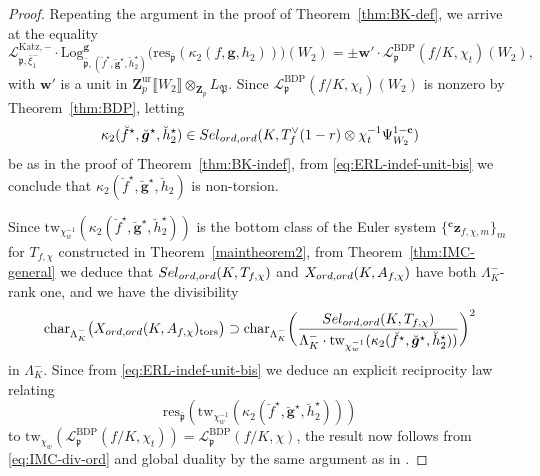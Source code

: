 \documentclass[10pt,letterpaper]{amsart}
\theoremstyle{plain}
\theoremstyle{definition}
\theoremstyle{definition}
\theoremstyle{plain}
\theoremstyle{plain}
\theoremstyle{plain}
\theoremstyle{remark}
\numberwithin{equation}{section}
\newcommand{\cc}{\mathbf{c}}
\newcommand{\Sel}{Sel}
\newcommand{\pp}{\mathfrak{p}}
\newcommand{\ppbar}{\bar{\mathfrak{p}}}
\newcommand{\ord}{{{\rm ord},{\rm ord}}}
\DeclareMathOperator{\ur}{\mathrm{ur}}
\DeclareMathOperator{\BDP}{BDP} %
\newcommand{\Z}{\mathbf{Z}}
\def\Sel{{\rm Sel}}
\newcommand{\dBr}[1]{\llbracket{#1}\rrbracket}
\newcommand{\bfg}{{\boldsymbol{g}}}
\begin{document}
\begin{proof}
Repeating the argument in the proof of Theorem~\ref{thm:BK-def}, we arrive at the equality
\begin{equation}\label{eq:ERL-indef-unit-bis}
\mathcal{L}_{\pp,\bar{\xi}_1^-}^{{\mathrm{Katz}},-}\cdot{\mathrm{Log}}^\bfg_{\ppbar,(\breve{f}^\star,\breve{\bfg}^\star,\breve{h}_2^\star)}\bigl({\mathrm{res}}_{\ppbar}(\kappa_2(f,\bfg,h_2))\bigr)(W_2)
=\pm\mathbf{w}'\cdot\mathscr{L}_\pp^{\BDP}(f/K,\chi_t)(W_2),
\end{equation}
with $\mathbf{w}'$ is a unit in $\Z_p^{\ur}\dBr{W_2}\otimes_{\Z_p}L_\mathfrak{P}$. Since $\mathscr{L}_\pp^{\BDP}(f/K,\chi_t)(W_2)$ is nonzero by Theorem~\ref{thm:BDP}, letting 
\[
\kappa_2(\breve{f}^\star,\breve{\bfg}^\star,\breve{h}_2^\star)\in\Sel_{\ord}(K,T_f^{\vee}(1-r)\otimes\chi_t^{-1}\Psi_{W_2}^{1-\cc}) 
\]
be as in the proof of Theorem~\ref{thm:BK-indef}, from \eqref{eq:ERL-indef-unit-bis} we conclude that $
\kappa_2(\breve{f}^\star,\breve{\bfg}^\star,\breve{h}_2)$ is non-torsion. 

Since ${\mathrm{tw}}_{\chi_w^{-1}}(\kappa_2(\breve{f}^\star,\breve{\bfg}^\star,\breve{h}_2^\star))$ is the bottom class of the Euler system $\{{}^\cc\mathbf{z}_{f,\chi,m}\}_m$ for $T_{f,\chi}$ constructed in Theorem~\ref{maintheorem2}, 
from Theorem~\ref{thm:IMC-general} 
we deduce that $\Sel_{\ord}(K,T_{f,\chi})$ and $X_{\ord}(K,A_{f,\chi})$ have both $\Lambda_K^-$-rank one, and we have the divisibility
\begin{equation}\label{eq:IMC-div-ord}
{\mathrm{char}}_{\Lambda_{K}^-}\bigl(X_{\ord}(K,A_{f,\chi})_{\mathrm{tors}}\bigr)\supset{\mathrm{char}}_{\Lambda_K^-}\biggl(\frac{\Sel_{\ord}(K,T_{f,\chi})}{\Lambda_K^-\cdot{\mathrm{tw}}_{\chi_w^{-1}}(\kappa_2(\breve{f}^\star,\breve{\bfg}^\star,\breve{h}_2^\star))}\biggr)^2
\end{equation}
in $\Lambda_K^-$. Since from \eqref{eq:ERL-indef-unit-bis} we deduce an explicit reciprocity law relating 
\[
{\mathrm{res}}_{\ppbar}({\mathrm{tw}}_{\chi_w^{-1}}(\kappa_2(\breve{f}^\star,\breve{\bfg}^\star,\breve{h}_2^\star)))
\]
to ${\mathrm{tw}}_{\chi_w}(\mathscr{L}_\pp^{\BDP}(f/K,\chi_t))=\mathscr{L}_\pp^{\BDP}(f/K,\chi)$, the result now follows from \eqref{eq:IMC-div-ord} and global duality by the same argument as in \cite[Thm.~5.1]{BCK-PRconj}.
\end{proof}
\end{document}
